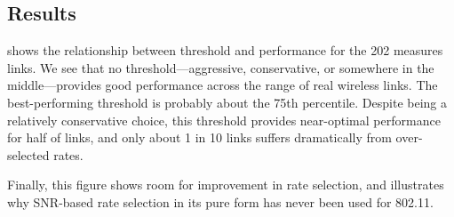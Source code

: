 \subsection{Results}
 shows the relationship between threshold and performance for the 202 measures links. We see that no threshold---aggressive, conservative, or somewhere in the middle---provides good performance across the range of real wireless links. The best-performing threshold is probably about the 75th percentile. Despite being a relatively conservative choice, this threshold provides near-optimal performance for half of links, and only about 1 in 10 links suffers dramatically from over-selected rates.

Finally, this figure shows room for improvement in rate selection, and illustrates why SNR-based rate selection in its pure form has never been used for 802.11. 

